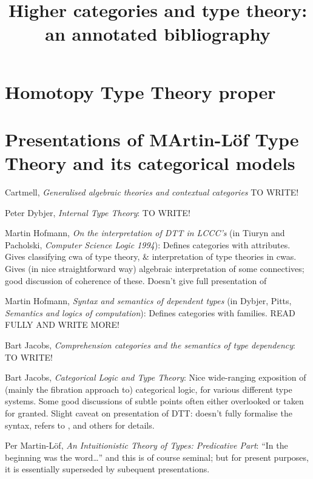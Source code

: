 \documentclass{article}
\begin{document}
\title{Higher categories and type theory: an annotated bibliography}

\section{Homotopy Type Theory proper}

\section{Presentations of MArtin-L\"o{}f Type Theory and its categorical models}

\cite{cartmell:generalised-algebraic-theories} Cartmell, \emph{Generalised algebraic theories and contextual categories}  TO WRITE!

\cite{dybjer:internal-type-theory} Peter Dybjer, \emph{Internal Type Theory}: TO WRITE!

\cite{hofmann:on-the-interpretation} Martin Hofmann, \emph{On the interpretation of DTT in LCCC's} (in Tiuryn and Pacholski, \emph{Computer Science Logic 1994}): Defines categories with attributes.  Gives classifying cwa of type theory, & interpretation of type theories in cwas.  Gives (in nice straightforward way) algebraic interpretation of some connectives; good discussion of coherence of these.  Doesn't give full presentation of

\cite{hofmann:syntax-and-semantics} Martin Hofmann, \emph{Syntax and semantics of dependent types} (in Dybjer, Pitts, \emph{Semantics and logics of computation}): Defines categories with families.  READ FULLY AND WRITE MORE! 

\cite{jacobs:comprehension-categories} Bart Jacobs, \emph{Comprehension categories and the semantics of type dependency}: TO WRITE!

\cite{jacobs:categorical-logic} Bart Jacobs, \emph{Categorical Logic and Type Theory}: Nice wide-ranging exposition of (mainly the fibration approach to) categorical logic, for various different type systems.  Some good discussions of subtle points often either overlooked or taken for granted.  Slight caveat on presentation of DTT: doesn't fully formalise the syntax, refers to \cite{pitts:categorical-logic}, \cite{hofmann:syntax-and-semantics} and others for details.

\cite{martin-loef:predicative-part} Per Martin-L\"o{}f, \emph{An Intuitionistic Theory of Types: Predicative Part}: ``In the beginning was the word\ldots'' and this is of course seminal; but for present purposes, it is essentially superseded by subequent presentations.
\end{document}
